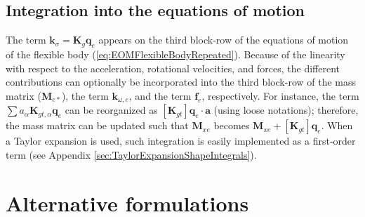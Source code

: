 \documentclass[wes, manuscript]{copernicus}
\renewcommand{\v}[1]{\boldsymbol{#1}}
\newcommand{\m}[1]{\boldsymbol{#1}}
\begin{document}


\subsection{Integration into the equations of motion}
The term $\v{k}_\sigma = \m{K}_g \v{q}_e$ appears on the third block-row of the equations of motion of the flexible body (\autoref{eq:EOMFlexibleBodyRepeated}).
Because of the linearity with respect to the acceleration, rotational velocities, and forces, the different contributions can optionally be incorporated into the third block-row of the mass matrix ($\m{M}_{e*}$), the term $\v{k}_{\omega,e}$, and the term $\v{f}_e$, respectively. For instance, the term $\sum a_\alpha \m{K}_{gt,\alpha} \v{q}_e$ can be reorganized as $[\m{K}_{gt}]\v{q}_e \cdot \v{a}$ (using loose notations); therefore, the mass matrix can be updated such that $\m{M}_{xe}$ becomes $\m{M}_{xe}+[\m{K}_{gt}]\v{q}_e$. When a Taylor expansion is used, such integration is easily implemented as a first-order term (see Appendix \ref{sec:TaylorExpansionShapeIntegrals}).









\section{Alternative formulations}
\label{sec:AlternativeFormulations}
\end{document}
